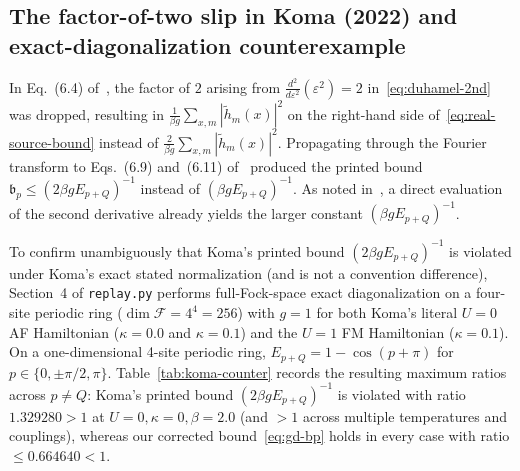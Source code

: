 \documentclass[11pt]{article}
\theoremstyle{definition}
\theoremstyle{remark}
\newcommand{\calF}{\mathcal{F}}
\begin{document}
\subsection{The factor-of-two slip in Koma (2022) and exact-diagonalization counterexample}\label{subsec:factor2}

In Eq.~(6.4) of~\cite{koma2022}, the factor of $2$ arising from $\frac{d^2}{d\varepsilon^2}(\varepsilon^2) = 2$ in~\eqref{eq:duhamel-2nd} was dropped, resulting in $\frac{1}{\beta g}\sum_{x,m}|\tilde{h}_m(x)|^2$ on the right-hand side of~\eqref{eq:real-source-bound} instead of $\frac{2}{\beta g}\sum_{x,m}|\tilde{h}_m(x)|^2$. Propagating through the Fourier transform to Eqs.~(6.9) and~(6.11) of~\cite{koma2022} produced the printed bound $\mathfrak{b}_p \le (2\beta g E_{p+Q})^{-1}$ instead of $(\beta g E_{p+Q})^{-1}$. As noted in~\cite{rens2026eta}, a direct evaluation of the second derivative already yields the larger constant $(\beta g E_{p+Q})^{-1}$.

To confirm unambiguously that Koma's printed bound $(2\beta g E_{p+Q})^{-1}$ is violated under Koma's exact stated normalization (and is not a convention difference), Section~4 of \texttt{replay.py} performs full-Fock-space exact diagonalization on a four-site periodic ring ($\dim \calF = 4^4 = 256$) with $g = 1$ for both Koma's literal $U = 0$ AF Hamiltonian ($\kappa = 0.0$ and $\kappa = 0.1$) and the $U = 1$ FM Hamiltonian ($\kappa = 0.1$). On a one-dimensional 4-site periodic ring, $E_{p+Q} = 1 - \cos(p + \pi)$ for $p \in \{0, \pm \pi/2, \pi\}$. Table~\ref{tab:koma-counter} records the resulting maximum ratios across $p \ne Q$: Koma's printed bound $(2\beta g E_{p+Q})^{-1}$ is violated with ratio $1.329280 > 1$ at $U=0, \kappa=0, \beta=2.0$ (and $> 1$ across multiple temperatures and couplings), whereas our corrected bound~\eqref{eq:gd-bp} holds in every case with ratio $\le 0.664640 < 1$.
\end{document}
